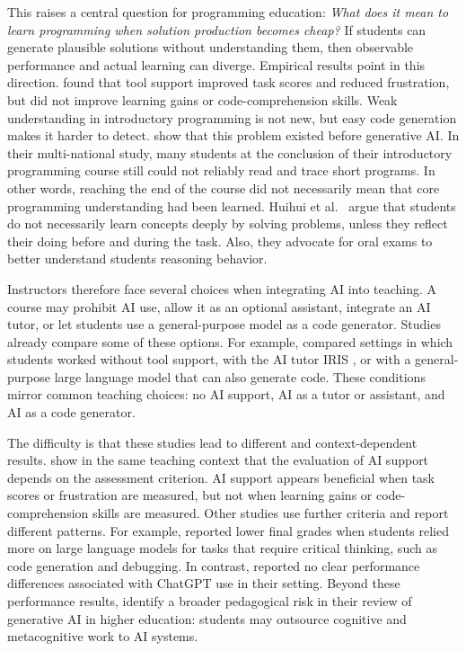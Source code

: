 \documentclass{article}
\begin{document}
This raises a central question for programming education:
\textit{What does it mean to learn programming when solution production becomes cheap?}
If students can generate plausible solutions without understanding them, then observable performance and actual learning can diverge. 
Empirical results point in this direction. \citet{BassnerEtAl2026LessStress} found that tool support improved task scores and reduced frustration, but did not improve learning gains or code-comprehension skills. 
Weak understanding in introductory programming is not new, but easy code generation makes it harder to detect. 
\citet{ListerEtAl2004Tracing} show that this problem existed before generative AI. In their multi-national study, many students at the conclusion of their introductory programming course still could not reliably read and trace short programs. In other words, reaching the end of the course did not necessarily mean that core programming understanding had been learned. Huihui et al.~\citet{HuihuiQiPhan2023} argue that students do not necessarily learn concepts deeply by solving problems, unless they reflect their doing before and during the task. Also, they advocate for oral exams to better understand students reasoning behavior.
 

Instructors therefore face several choices when integrating AI into teaching. A course may prohibit AI use, allow it as an optional assistant, integrate an AI tutor, or let students use a general-purpose model as a code generator. Studies already compare some of these options. For example, \citet{BassnerEtAl2026LessStress,bassner2025understanding} compared settings in which students worked without tool support, with the AI tutor IRIS \citep{bassner2024iris}, or with a general-purpose large language model that can also generate code. These conditions mirror common teaching choices: no AI support, AI as a tutor or assistant, and AI as a code generator.

The difficulty is that these studies lead to different and context-dependent results. 
\citet{BassnerEtAl2026LessStress,bassner2025understanding} show in the same teaching context that the evaluation of AI support depends on the assessment criterion. AI support appears beneficial when task scores or frustration are measured, but not when learning gains or code-comprehension skills are measured. Other studies use further criteria and report different patterns. 
For example, \citet{jost-2024-impact-llms-programming-education} reported lower final grades when students relied more on large language models for tasks that require critical thinking, such as code generation and debugging. 
In contrast, \citet{math12050629} reported no clear performance differences associated with ChatGPT use in their setting.
Beyond these performance results, \citet{Qian2025PedagogicalGenAIHE} identify a broader pedagogical risk in their review of generative AI in higher education: students may outsource cognitive and metacognitive work to AI systems.
\end{document}
